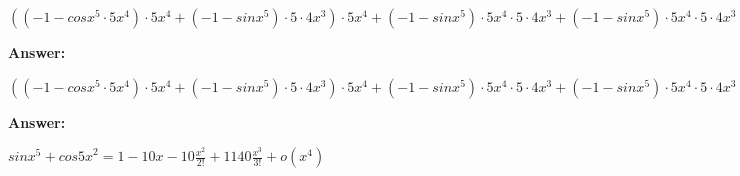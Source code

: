 \documentclass[12pt,a4paper,fleqn]{article}
\theoremstyle{definition}
\begin{document}
$(( -1  - cos{ x }^{ 5 } \cdot  5 { x }^{ 4 }) \cdot  5 { x }^{ 4 } + ( -1  - sin{ x }^{ 5 }) \cdot  5  \cdot  4 { x }^{ 3 }) \cdot  5 { x }^{ 4 } + ( -1  - sin{ x }^{ 5 }) \cdot  5 { x }^{ 4 } \cdot  5  \cdot  4 { x }^{ 3 } + ( -1  - sin{ x }^{ 5 }) \cdot  5 { x }^{ 4 } \cdot  5  \cdot  4 { x }^{ 3 } + cos{ x }^{ 5 } \cdot  5  \cdot  4  \cdot  3 { x }^{ 2 } +  2  \cdot ( -1  - ( -1  - sin 5  x ) \cdot  5  \cdot  5 ) \cdot  5  \cdot cos 5  x  +  2  \cdot ( -1  - cos 5  x  \cdot  5 ) \cdot  5  \cdot ( -1  - sin 5  x ) \cdot  5  +  2  \cdot ( -1  - cos 5  x  \cdot  5 ) \cdot  5  \cdot ( -1  - sin 5  x ) \cdot  5  +  2  \cdot ( -1  - sin 5  x ) \cdot  5  \cdot ( -1  - cos 5  x  \cdot  5 ) \cdot  5  = (( -1  - cos{ x }^{ 5 } \cdot  5 { x }^{ 4 }) \cdot  5 { x }^{ 4 } + ( -1  - sin{ x }^{ 5 }) \cdot  5  \cdot  4 { x }^{ 3 }) \cdot  5 { x }^{ 4 } + ( -1  - sin{ x }^{ 5 }) \cdot  5 { x }^{ 4 } \cdot  5  \cdot  4 { x }^{ 3 } + ( -1  - sin{ x }^{ 5 }) \cdot  5 { x }^{ 4 } \cdot  5  \cdot  4 { x }^{ 3 } + cos{ x }^{ 5 } \cdot  5  \cdot  4  \cdot  3 { x }^{ 2 } +  2  \cdot ( -1  - ( -1  - sin 5  x ) \cdot  5  \cdot  5 ) \cdot  5  \cdot cos 5  x  +  2  \cdot ( -1  - cos 5  x  \cdot  5 ) \cdot  5  \cdot ( -1  - sin 5  x ) \cdot  5  +  2  \cdot ( -1  - cos 5  x  \cdot  5 ) \cdot  5  \cdot ( -1  - sin 5  x ) \cdot  5  +  2  \cdot ( -1  - sin 5  x ) \cdot  5  \cdot ( -1  - cos 5  x  \cdot  5 ) \cdot  5 $


\textbf{Answer:}

$(( -1  - cos{ x }^{ 5 } \cdot  5 { x }^{ 4 }) \cdot  5 { x }^{ 4 } + ( -1  - sin{ x }^{ 5 }) \cdot  5  \cdot  4 { x }^{ 3 }) \cdot  5 { x }^{ 4 } + ( -1  - sin{ x }^{ 5 }) \cdot  5 { x }^{ 4 } \cdot  5  \cdot  4 { x }^{ 3 } + ( -1  - sin{ x }^{ 5 }) \cdot  5 { x }^{ 4 } \cdot  5  \cdot  4 { x }^{ 3 } + cos{ x }^{ 5 } \cdot  5  \cdot  4  \cdot  3 { x }^{ 2 } +  2  \cdot ( -1  - ( -1  - sin 5  x ) \cdot  5  \cdot  5 ) \cdot  5  \cdot cos 5  x  +  2  \cdot ( -1  - cos 5  x  \cdot  5 ) \cdot  5  \cdot ( -1  - sin 5  x ) \cdot  5  +  2  \cdot ( -1  - cos 5  x  \cdot  5 ) \cdot  5  \cdot ( -1  - sin 5  x ) \cdot  5  +  2  \cdot ( -1  - sin 5  x ) \cdot  5  \cdot ( -1  - cos 5  x  \cdot  5 ) \cdot  5 $


\textbf{Answer:}

$sin{ x }^{ 5 } + {cos 5  x }^{ 2 } = 1  -10 x  -10 \frac{x^{2}}{2!}+ 1140 \frac{x^{3}}{3!}+ o(x^4)$
\end{document}
